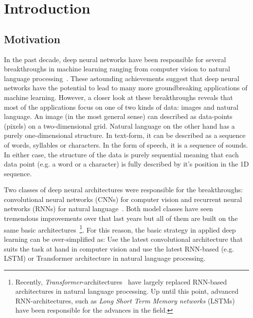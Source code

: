 \chapter{Introduction}
\label{chapter:Introduction}


\section{Motivation}
\label{sec:motivation}

In the past decade, deep neural networks have been responsible for several breakthroughs in machine learning ranging from computer vision to natural language processing~\cite{Goodfellow-et-al-2016}. These astounding achievements suggest that deep neural networks have the potential to lead to many more groundbreaking applications of machine learning. However, a closer look at these breakthroughs reveals that most of the applications focus on one of two kinds of data: images and natural language. An image (in the most general sense) can described as data-points (pixels) on a two-dimensional grid. Natural language on the other hand has a purely one-dimensional structure. In text-form, it can be described as a sequence of words, syllables or characters. In the form of speech, it is a sequence of sounds. In either case, the structure of the data is purely sequential meaning that each data point (e.g. a word or a character) is fully described by it's position in the 1D sequence.

Two classes of deep neural architectures were responsible for the breakthroughs: convolutional neural networks (CNNs) for computer vision and recurrent neural networks (RNNs) for natural language~\cite{Goodfellow-et-al-2016}. Both model classes have seen tremendous improvements over that last years but all of them are built on the same basic architectures~\footnote{Recently, \textit{Transformer}-architectures~\cite{Vaswani2017} have largely replaced RNN-based architectures in natural language processing. Up until this point, advanced RNN-architectures, such as \textit{Long Short Term Memory networks} (LSTMs)~\cite{Hochreiter1997} have been responsible for the advances in the field.}. For this reason, the basic strategy in applied deep learning can be over-simplified as: Use the latest convolutional architecture that suits the task at hand in computer vision and use the latest RNN-based (e.g. LSTM) or Transformer architecture in natural language processing.

